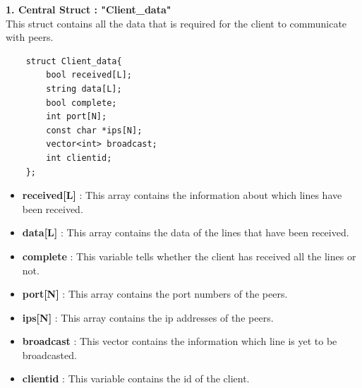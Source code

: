 \documentclass[12pt]{scrartcl}
\begin{document}
\textbf{1. Central Struct : "Client\_data"}\\
This struct contains all the data that is required for the client to communicate with peers.\\
\begin{verbatim}
    struct Client_data{
        bool received[L];
        string data[L];
        bool complete;
        int port[N];
        const char *ips[N];
        vector<int> broadcast;
        int clientid;
    };
\end{verbatim}
\begin{itemize}
    \item \textbf{received[L]} : This array contains the information about which lines have been received.
    \item \textbf{data[L]} : This array contains the data of the lines that have been received.
    \item \textbf{complete} : This variable tells whether the client has received all the lines or not.
    \item \textbf{port[N]} : This array contains the port numbers of the peers.
    \item \textbf{ips[N]} : This array contains the ip addresses of the peers.
    \item \textbf{broadcast} : This vector contains the information which line is yet to be broadcasted.
    \item \textbf{clientid} : This variable contains the id of the client. 
\end{itemize}
\end{document}
